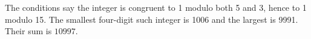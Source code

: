 The conditions say the integer is congruent to 1 modulo both 5 and 3, hence to 1 modulo 15. The smallest four-digit such integer is 1006 and the largest is 9991. Their sum is $\boxed{10997}$.
